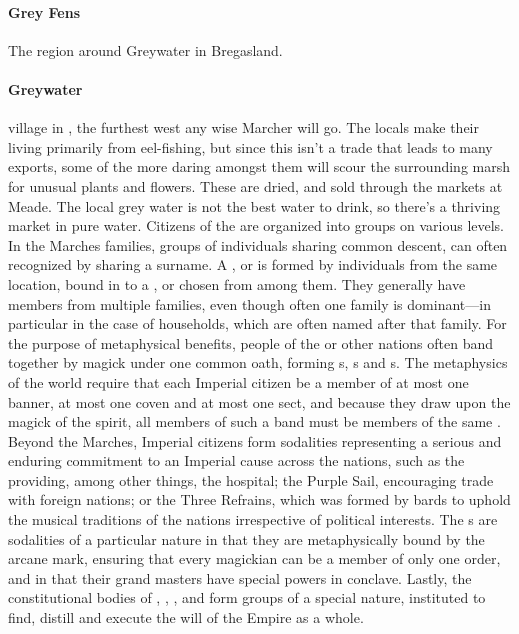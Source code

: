 \paragraph{Grey Fens} The region around Greywater in Bregasland.
\paragraph{Greywater} village in , the furthest west any wise Marcher will go. The locals make their living primarily from eel-fishing, but since this isn’t a trade that leads to many exports, some of the more daring amongst them will scour the surrounding marsh for unusual plants and flowers. These are dried, and sold through the markets at Meade. The local grey water is not the best water to drink, so there's a thriving market in pure water.
 Citizens of the  are organized into groups on various levels. \localpar {} In the Marches families, groups of individuals sharing common descent, can often recognized by sharing a surname. A ,  or  is formed by individuals from the same location, bound in  to a ,  or  chosen from among them. They generally have members from multiple families, even though often one family is dominant—in particular in the case of households, which are often named after that family. \localpar {} For the purpose of metaphysical benefits, people of the  or other nations often band together by magick under one common oath, forming s, s and s. The metaphysics of the world require that each Imperial citizen be a member of at most one banner, at most one coven and at most one sect, and because they draw upon the magick of the  spirit, all members of such a band must be members of the same . \localpar {} Beyond the Marches, Imperial citizens form sodalities representing a serious and enduring commitment to an Imperial cause across the nations, such as the  providing, among other things, the  hospital; the Purple Sail, encouraging trade with foreign nations; or the Three Refrains, which was formed by bards to uphold the musical traditions of the nations irrespective of political interests. The s are sodalities of a particular nature in that they are metaphysically bound by the  arcane mark, ensuring that every magickian can be a member of only one order, and in that their grand masters have special powers in conclave. \localpar {} Lastly, the constitutional bodies of , , ,  and  form groups of a special nature, instituted to find, distill and execute the will of the Empire as a whole.
\bigparagraphendtwiddle
